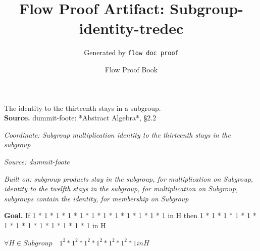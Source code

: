 \documentclass[11pt]{article}
\title{Flow Proof Artifact: Subgroup-identity-tredec}
\author{Generated by \texttt{flow doc proof}}
\date{Flow Proof Book}
\theoremstyle{definition}
\begin{document}
\maketitle
The identity to the thirteenth stays in a subgroup.\\[0.5em]
\textbf{Source.} dummit-foote: *Abstract Algebra*, §2.2\\[0.5em]
\bigskip
{}\par
\smallskip\noindent\textit{Coordinate: Subgroup \cdot multiplication \cdot identity to the thirteenth stays in the subgroup}\par
\smallskip\noindent\textit{Source: dummit-foote}\par
\smallskip\noindent\textit{Built on: subgroup products stay in the subgroup, for multiplication on Subgroup, identity to the twelfth stays in the subgroup, for multiplication on Subgroup, subgroups contain the identity, for membership on Subgroup}\par
\medskip
\noindent\textbf{Goal.} If 1 * 1 * 1 * 1 * 1 * 1 * 1 * 1 * 1 * 1 * 1 * 1 in H then 1 * 1 * 1 * 1 * 1 * 1 * 1 * 1 * 1 * 1 * 1 * 1 * 1 in H\par
\noindent$\displaystyle \forall H \in Subgroup\quad 1^{2} * 1^{2} * 1^{2} * 1^{2} * 1^{2} * 1^{2} * 1 in H$\par
\medskip
\noindent
\end{document}
